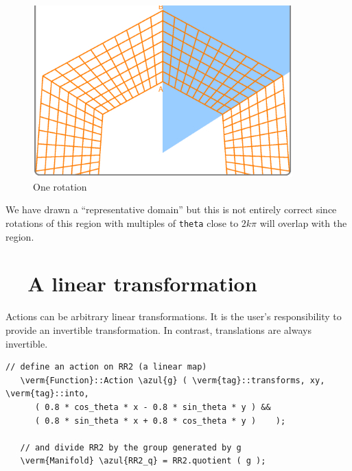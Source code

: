 \begin{figure}[ht] \centering
  \includegraphics[width=100mm]{sector-1.eps}
  \caption{One rotation}
  \label{\numb section 7.\numb fig 7}
\end{figure}

We have drawn a ``representative domain'' but this is not entirely correct since
rotations of this region with multiples of {\small\tt theta} close to $ 2k\pi $
will overlap with the region.


\section{~~A linear transformation}\label{\numb section 7.\numb parag 12}

Actions can be arbitrary linear transformations.
It is the user's responsibility to provide an invertible transformation.
In contrast, translations are always invertible.

\begin{Verbatim}[commandchars=\\\{\},formatcom=\small\tt,frame=single,
   label=parag-\ref{\numb section 7.\numb parag 12}.cpp,rulecolor=\color{coment},
   baselinestretch=0.94,framesep=2mm                                             ]
   // define an action on RR2 (a linear map)
   \verm{Function}::Action \azul{g} ( \verm{tag}::transforms, xy, \verm{tag}::into,
      ( 0.8 * cos_theta * x - 0.8 * sin_theta * y ) &&
      ( 0.8 * sin_theta * x + 0.8 * cos_theta * y )    );

   // and divide RR2 by the group generated by g
   \verm{Manifold} \azul{RR2_q} = RR2.quotient ( g );
\end{Verbatim}

